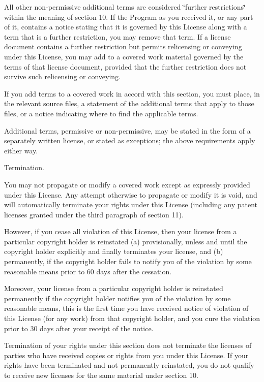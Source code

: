 All other non-\/permissive additional terms are considered \char`\"{}further
restrictions\char`\"{} within the meaning of section 10. If the Program as you received it, or any part of it, contains a notice stating that it is governed by this License along with a term that is a further restriction, you may remove that term. If a license document contains a further restriction but permits relicensing or conveying under this License, you may add to a covered work material governed by the terms of that license document, provided that the further restriction does not survive such relicensing or conveying.

If you add terms to a covered work in accord with this section, you must place, in the relevant source files, a statement of the additional terms that apply to those files, or a notice indicating where to find the applicable terms.

Additional terms, permissive or non-\/permissive, may be stated in the form of a separately written license, or stated as exceptions; the above requirements apply either way.


\begin{DoxyEnumerate}
\item Termination.
\end{DoxyEnumerate}

You may not propagate or modify a covered work except as expressly provided under this License. Any attempt otherwise to propagate or modify it is void, and will automatically terminate your rights under this License (including any patent licenses granted under the third paragraph of section 11).

However, if you cease all violation of this License, then your license from a particular copyright holder is reinstated (a) provisionally, unless and until the copyright holder explicitly and finally terminates your license, and (b) permanently, if the copyright holder fails to notify you of the violation by some reasonable means prior to 60 days after the cessation.

Moreover, your license from a particular copyright holder is reinstated permanently if the copyright holder notifies you of the violation by some reasonable means, this is the first time you have received notice of violation of this License (for any work) from that copyright holder, and you cure the violation prior to 30 days after your receipt of the notice.

Termination of your rights under this section does not terminate the licenses of parties who have received copies or rights from you under this License. If your rights have been terminated and not permanently reinstated, you do not qualify to receive new licenses for the same material under section 10.


